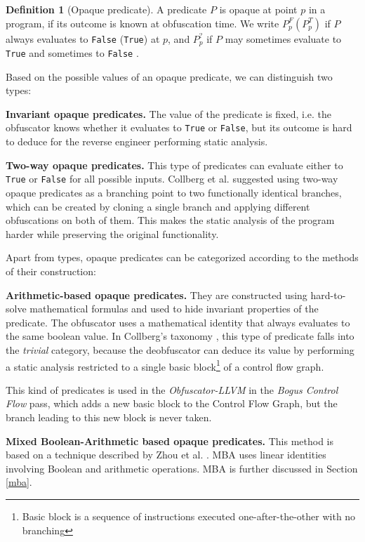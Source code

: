 \documentclass[
  digital, %
  notable,   %
  twoside, %
  nolof,     %
  nolot,     %
]{fithesis3}
\theoremstyle{definition}
\newtheorem{definition}{Definition}[section]
\begin{document}
\begin{definition}[Opaque predicate]
\label{def:opaque}
A predicate $P$ is opaque at point $p$ in a program, if its outcome is known at obfuscation time. We write $P_p^F (P_p^T)$ if $P$ always evaluates to \texttt{False} (\texttt{True}) at $p$, and $P_p^?$ if $P$ may sometimes evaluate to \texttt{True} and sometimes to \texttt{False} \cite{manufacturing_opaque}.
\end{definition}

Based on the possible values of an opaque predicate, we can distinguish two types:

\textbf{Invariant opaque predicates.} The value of the predicate is fixed, i.e. the obfuscator knows whether it evaluates to \texttt{True} or \texttt{False}, but its outcome is hard to deduce for the reverse engineer performing static analysis. 

\textbf{Two-way opaque predicates.} This type of predicates can evaluate either to \texttt{True} or \texttt{False} for all possible inputs. Collberg et al. \cite{taxonomy_obf} suggested using two-way opaque predicates as a branching point to two functionally identical branches, which can be created by cloning a single branch and applying different obfuscations on both of them. This makes the static analysis of the program harder while preserving the original functionality. 

Apart from types, opaque predicates can be categorized according to the methods of their construction: 

\textbf{Arithmetic-based opaque predicates.} They are constructed using hard-to-solve mathematical formulas and used to hide invariant properties of the predicate. The obfuscator uses a mathematical identity that always evaluates to the same boolean value. In Collberg's taxonomy \cite{taxonomy_obf}, this type of predicate falls into the \textit{trivial} category, because the deobfuscator can deduce its value by performing a static analysis restricted to a single basic block\footnote{Basic block is a sequence of instructions executed one-after-the-other with no branching\cite{dragonBook}} of a control flow graph. 

This kind of predicates is used in the \textit{Obfuscator-LLVM} in the \textit{Bogus Control Flow} pass, which adds a new basic block to the Control Flow Graph, but the branch leading to this new block is never taken. 

\textbf{Mixed Boolean-Arithmetic based opaque predicates.} This method is based on a technique described by Zhou et al. \cite{mba_zhou}.
MBA uses linear identities involving Boolean and arithmetic operations. MBA is further discussed in Section \ref{mba}.
\end{document}

